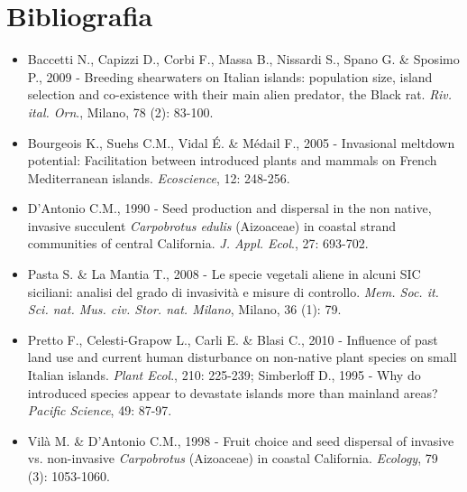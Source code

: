 \section*{Bibliografia}
\begin{itemize}\itemsep0pt
	\item Baccetti N., Capizzi D., Corbi F., Massa B., Nissardi S., Spano G. \&
Sposimo P., 2009 - Breeding shearwaters on Italian islands: population
size, island selection and co-existence with their main alien predator,
the Black rat. \textit{Riv. ital. Orn}., Milano, 78 (2): 83-100.

	\item Bourgeois K., Suehs C.M., Vidal \'E. \& M\'edail F., 2005 - Invasional
meltdown potential: Facilitation between introduced plants and mammals
on French Mediterranean islands. \textit{Ecoscience}, 12: 248-256. 

	\item D{\textquoteright}Antonio C.M., 1990 - Seed production and dispersal in
the non native, invasive succulent \textit{Carpobrotus edulis
}(Aizoaceae) in coastal strand communities of central California.
\textit{J. Appl. Ecol}., 27: 693-702. 

	\item Pasta S. \& La Mantia T., 2008 - Le specie vegetali aliene in alcuni SIC
siciliani: analisi del grado di invasivit\`a e misure di controllo.
\textit{Mem. Soc. it. Sci. nat. Mus. civ. Stor. nat. Milano}, Milano,
36 (1): 79. 

	\item Pretto F., Celesti-Grapow L., Carli E. \& Blasi C., 2010 - Influence of
past land use and current human disturbance on non-native plant species
on small Italian islands. \textit{Plant Ecol}., 210: 225-239;
Simberloff D., 1995 - Why do introduced species appear to devastate
islands more than mainland areas? \textit{Pacific Science}, 49: 87-97. 

	\item Vil\`a M. \& D{\textquoteright}Antonio C.M., 1998 - Fruit choice and
seed dispersal of invasive vs. non-invasive \textit{Carpobrotus
}(Aizoaceae) in coastal California. \textit{Ecology}, 79 (3):
1053-1060.
\end{itemize}
